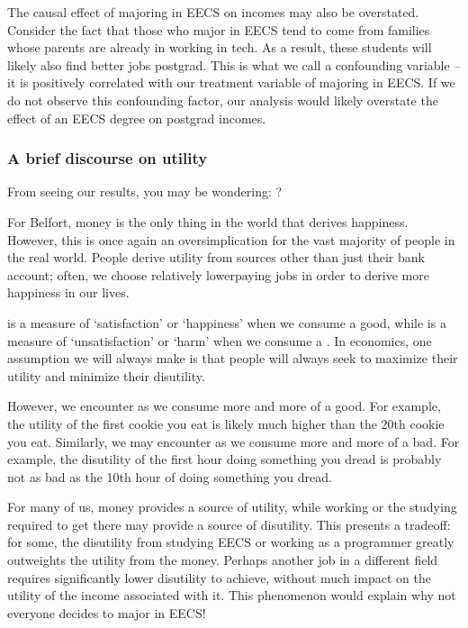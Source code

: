 \documentclass[letterpaper,10pt,english]{jupyterBook}
\begin{document}
\sphinxAtStartPar
The causal effect of majoring in EECS on incomes may also be overstated. Consider the fact that those who major in EECS tend to come from families whose parents are already in working in tech. As a result, these students will likely also find better jobs post\sphinxhyphen{}grad. This is what we call a confounding variable – it is positively correlated with our treatment variable of majoring in EECS. If we do not observe this confounding factor, our analysis would likely overstate the effect of an EECS degree on post\sphinxhyphen{}grad incomes.


\subsubsection{A brief discourse on utility}
\label{\detokenize{content/00-intro/index:a-brief-discourse-on-utility}}
\sphinxAtStartPar
From seeing our results, you may be wondering: ?

\sphinxAtStartPar
For Belfort, money is the only thing in the world that derives happiness.
However, this is once again an oversimplication for the vast majority of people in the real world.
People derive utility from sources other than just their bank account; often, we choose relatively lower\sphinxhyphen{}paying jobs in order to derive more happiness in our lives.

\sphinxAtStartPar
{} is a measure of ‘satisfaction’ or ‘happiness’ when we consume a good, while  is a measure of ‘unsatisfaction’ or ‘harm’ when we consume a . In economics, one assumption we will always make is that people will always seek to maximize their utility and minimize their disutility.

\sphinxAtStartPar
However, we encounter  as we consume more and more of a good. For example, the utility of the first cookie you eat is likely much higher than the 20th cookie you eat. Similarly, we may encounter  as we consume more and more of a bad. For example, the disutility of the first hour doing something you dread is probably not as bad as the 10th hour of doing something you dread.

\sphinxAtStartPar
For many of us, money provides a source of utility, while working or the studying required to get there may provide a source of disutility. This presents a tradeoff: for some, the disutility from studying EECS or working as a programmer greatly outweights the utility from the money. Perhaps another job in a different field requires significantly lower disutility to achieve, without much impact on the utility of the income associated with it. This phenomenon would explain why not everyone decides to major in EECS!
\end{document}
